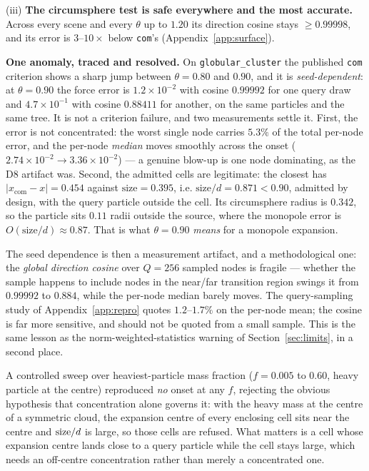 (iii) \textbf{The circumsphere test is safe everywhere and the most accurate.} Across every scene and
every $\theta$ up to $1.20$ its direction cosine stays $\ge0.99998$, and its error is $3$--$10\times$
below \texttt{com}'s (Appendix~\ref{app:surface}).

\noindent\textbf{One anomaly, traced and resolved.} On \texttt{globular\_cluster} the published
\texttt{com} criterion shows a sharp jump between $\theta=0.80$ and $0.90$, and it is
\emph{seed-dependent}: at $\theta=0.90$ the force error is $1.2\times10^{-2}$ with cosine $0.99992$
for one query draw and $4.7\times10^{-1}$ with cosine $0.88411$ for another, on the same particles and
the same tree. It is not a criterion failure, and two measurements settle it. First, the error is not
concentrated: the worst single node carries $5.3\%$ of the total per-node error, and the per-node
\emph{median} moves smoothly across the onset ($2.74\times10^{-2}\to3.36\times10^{-2}$) --- a genuine
blow-up is one node dominating, as the D8 artifact was. Second, the admitted cells are legitimate: the
closest has $|x_{\mathrm{com}}-x|=0.454$ against $\text{size}=0.395$, i.e. $\text{size}/d=0.871<0.90$,
admitted by design, with the query particle outside the cell. Its circumsphere radius is $0.342$, so
the particle sits $0.11$ radii outside the source, where the monopole error is
$O(\text{size}/d)\approx0.87$. That is what $\theta=0.90$ \emph{means} for a monopole expansion.

The seed dependence is then a measurement artifact, and a methodological one: the \emph{global
direction cosine} over $Q=256$ sampled nodes is fragile --- whether the sample happens to include
nodes in the near/far transition region swings it from $0.99992$ to $0.884$, while the per-node median
barely moves. The query-sampling study of Appendix~\ref{app:repro} quotes $1.2$--$1.7\%$ on the
per-node mean; the cosine is far more sensitive, and should not be quoted from a small sample. This is
the same lesson as the norm-weighted-statistics warning of Section~\ref{sec:limits}, in a second
place.

A controlled sweep over heaviest-particle mass fraction ($f=0.005$ to $0.60$, heavy particle at the
centre) reproduced \emph{no} onset at any $f$, rejecting the obvious hypothesis that concentration
alone governs it: with the heavy mass at the centre of a symmetric cloud, the expansion centre of
every enclosing cell sits near the centre and ${\rm size}/d$ is large, so those cells are refused.
What matters is a cell whose expansion centre lands close to a query particle while the cell stays
large, which needs an off-centre concentration rather than merely a concentrated one.

